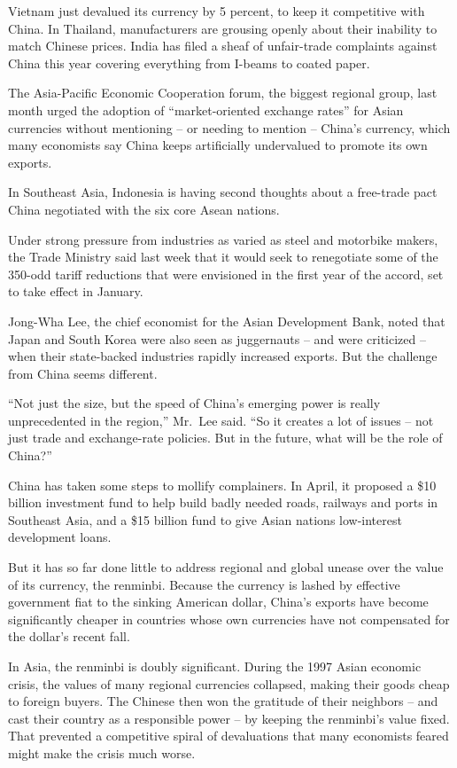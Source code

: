 ﻿\documentclass[12pt]{article}
\begin{document}
Vietnam just devalued its currency by 5 percent, to keep it competitive with China. In Thailand,
manufacturers are grousing openly about their inability to match Chinese prices. India has filed a
sheaf of unfair-trade complaints against China this year covering everything from I-beams to coated
paper.

The Asia-Pacific Economic Cooperation forum, the biggest regional group, last month urged the
adoption of ``market-oriented exchange rates'' for Asian currencies without mentioning -- or needing
to mention -- China's currency, which many economists say China keeps artificially undervalued to
promote its own exports.

In Southeast Asia, Indonesia is having second thoughts about a free-trade pact China negotiated with
the six core Asean nations.

Under strong pressure from industries as varied as steel and motorbike makers, the Trade Ministry
said last week that it would seek to renegotiate some of the 350-odd tariff reductions that were
envisioned in the first year of the accord, set to take effect in January.

Jong-Wha Lee, the chief economist for the Asian Development Bank, noted that Japan and South Korea
were also seen as juggernauts -- and were criticized -- when their state-backed industries rapidly
increased exports. But the challenge from China seems different.

``Not just the size, but the speed of China's emerging power is really unprecedented in the
region,'' Mr.~Lee said. ``So it creates a lot of issues -- not just trade and exchange-rate
policies. But in the future, what will be the role of China?''

China has taken some steps to mollify complainers. In April, it proposed a \$10 billion investment
fund to help build badly needed roads, railways and ports in Southeast Asia, and a \$15 billion fund
to give Asian nations low-interest development loans.

But it has so far done little to address regional and global unease over the value of its currency,
the renminbi. Because the currency is lashed by effective government fiat to the sinking American
dollar, China's exports have become significantly cheaper in countries whose own currencies have not
compensated for the dollar's recent fall.

In Asia, the renminbi is doubly significant. During the 1997 Asian economic crisis, the values of
many regional currencies collapsed, making their goods cheap to foreign buyers. The Chinese then won
the gratitude of their neighbors -- and cast their country as a responsible power -- by keeping the
renminbi's value fixed. That prevented a competitive spiral of devaluations that many economists
feared might make the crisis much worse.
\end{document}
